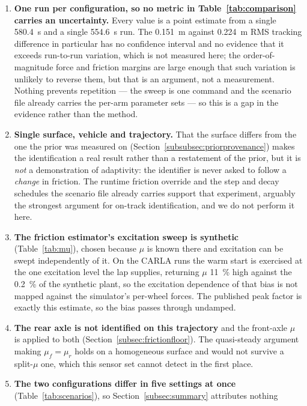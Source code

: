 \begin{enumerate}
\item \textbf{One run per configuration, so no metric in
Table~\ref{tab:comparison} carries an uncertainty.} Every value is a point
estimate from a single \SI{580.4}{\second} and a single \SI{554.6}{\second}
run. The \SI{0.151}{\meter} against \SI{0.224}{\meter} RMS tracking difference
in particular has no confidence interval and no evidence that it exceeds
run-to-run variation, which is not measured here; the order-of-magnitude force
and friction margins are large enough that such variation is unlikely to
reverse them, but that is an argument, not a measurement. Nothing prevents
repetition --- the sweep is one command and the scenario file already carries
the per-arm parameter sets --- so this is a gap in the evidence rather than the
method.
\item \textbf{Single surface, vehicle and trajectory.} That the surface differs
from the one the prior was measured on
(Section~\ref{subsubsec:priorprovenance}) makes the identification a real
result rather than a restatement of the prior, but it is \emph{not} a
demonstration of adaptivity: the identifier is never asked to follow a
\emph{change} in friction. The runtime friction override and the step and decay
schedules the scenario file already carries support that experiment, arguably
the strongest argument for on-track identification, and we do not perform it
here.
\item \textbf{The friction estimator's excitation sweep is synthetic}
(Table~\ref{tab:mu}), chosen because $\mu$ is known there and excitation can be
swept independently of it. On the CARLA runs the warm start is exercised at the
one excitation level the lap supplies, returning $\mu$ \SI{11}{\percent} high
against the \SI{0.2}{\percent} of the synthetic plant, so the excitation
dependence of that bias is not mapped against the simulator's per-wheel forces.
The published peak factor is exactly this estimate, so the bias passes through
undamped.
\item \textbf{The rear axle is not identified on this trajectory} and the
front-axle $\mu$ is applied to both (Section~\ref{subsec:frictionfloor}). The
quasi-steady argument making $\mu_{f}=\mu_{r}$ holds on a homogeneous surface
and would not survive a split-$\mu$ one, which this sensor set cannot detect in
the first place.
\item \textbf{The two configurations differ in five settings at once}
(Table~\ref{tab:scenarios}), so Section~\ref{subsec:summary} attributes nothing

\end{enumerate}
